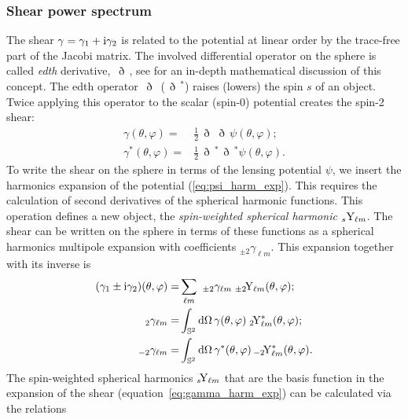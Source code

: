 \documentclass[fleqn,usenatbib]{mnras} %
\newcommand{\edth}{\,\eth\,}
\begin{document}
\subsubsection{Shear power spectrum}

The shear $\gamma = \gamma_1 + {\rm i} \gamma_2$ is related to the potential at
linear order by the trace-free part of the Jacobi matrix. The involved
differential operator on the sphere is called \emph{edth} derivative, $\edth$,
see \cite{2005PhRvD..72b3516C} for an in-depth mathematical discussion of this
concept. The edth operator $\edth$ ($\edth^\ast$) raises (lowers) the spin $s$
of an object. Twice applying this operator to the scalar (spin-0) potential
creates the spin-2 shear:
%
\begin{align}
  \gamma(\theta, \varphi) = & \frac 1 2 \edth \edth \psi(\theta, \varphi);
    \nonumber \\
  \gamma^\ast(\theta, \varphi) = & \frac 1 2 \edth^\ast \edth^\ast \psi(\theta, \varphi).
  \label{gamma_psi_spher}
\end{align}
%
To write the shear on the sphere in terms of the lensing potential $\psi$, we
insert the harmonics expansion of the potential (\ref{eq:psi_harm_exp}). This
requires the calculation of second derivatives of the spherical harmonic functions.
This operation defines a new object, the \emph{spin-weighted spherical
harmonic} $_s{\rm Y}_{\ell m}$. The shear can be written on the sphere in terms
of these functions as a spherical harmonics multipole expansion with
coefficients $_{\pm 2} \gamma_{\ell m}$. This expansion together with its inverse
is
%
%
\begin{align}
  (\gamma_1 \pm {\rm i} \gamma_2)(\theta, \varphi) = & \sum_{\ell m} \,\, _{\pm 2}\gamma_{\ell m} \; _{\pm 2}\!{\rm Y}_{\ell m}(\theta, \varphi);
  \label{eq:gamma_harm_exp}
    \\
  \, _2 \gamma_{\ell m} = & \int_{\mathbb{S}^2} {\rm d} \Omega \, \gamma(\theta, \varphi) \;  _2\!{\rm Y}^\ast_{\ell m}(\theta, \varphi);
    \nonumber \\
  \, _{-2} \gamma_{\ell m} = & \int_{\mathbb{S}^2} {\rm d} \Omega \, \gamma^\ast(\theta, \varphi) \,  _{-2}\!{\rm Y}^\ast_{\ell m}(\theta, \varphi).
  \label{eq:gamma_harm_exp_inv}
\end{align}
%
The spin-weighted spherical harmonics $_s\!{\rm Y}_{\ell m}$ that are the basis function
in the expansion of the shear (equation~\ref{eq:gamma_harm_exp}) can be calculated via the relations
\end{document}
